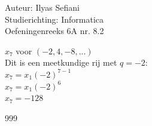 \documentclass[a4paper]{article}
\begin{document}
\noindent \large Auteur: Ilyas Sefiani \\
\noindent \large Studierichting: Informatica\\
\noindent \large Oefeningenreeks 6A nr. 8.2\\

\medskip

\normalsize

$x_{7}$ voor $(-2,4,-8,...)$\\

Dit is een meetkundige rij met $q=-2$:\\

$x_{7}= x_1 (-2)^{7-1}$\\

$x_{7}= x_1 (-2)^{6}$\\

$x_{7}= -128$\\

\begin{thebibliography}{999}
\end{thebibliography}
\end{document}
